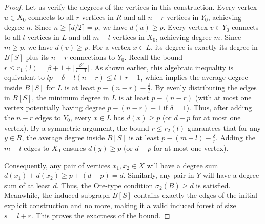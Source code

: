 \documentclass[10pt,a4paper]{amsart}
\begin{document}
\begin{proof}
Let us verify the degrees of the vertices in this construction. 
Every vertex $u \in X_0$ connects to all $r$ vertices in $R$ and all $n-r$ vertices in $Y_0$, achieving degree $n$. Since $n \ge \lceil d/2 \rceil = p$, we have $d(u) \ge p$.
Every vertex $v \in Y_0$ connects to all $l$ vertices in $L$ and all $m-l$ vertices in $X_0$, achieving degree $m$. Since $m \ge p$, we have $d(v) \ge p$.
For a vertex $x \in L$, its degree is exactly its degree in $B[S]$ plus its $n-r$ connections to $Y_0$. 
Recall the bound $r \le r_1(l) = \beta + 1 + \lfloor \frac{\beta'}{l-1} \rfloor$. As shown earlier, this algebraic inequality is equivalent to $lp - \delta - l(n-r) \le l+r-1$, which implies the average degree inside $B[S]$ for $L$ is at least $p - (n-r) - \frac{\delta}{l}$. By evenly distributing the edges in $B[S]$, the minimum degree in $L$ is at least $p - (n-r)$ (with at most one vertex potentially having degree $p - (n-r) - 1$ if $\delta=1$). Thus, after adding the $n-r$ edges to $Y_0$, every $x \in L$ has $d(x) \ge p$ (or $d-p$ for at most one vertex). 
By a symmetric argument, the bound $r \le r_2(l)$ guarantees that for any $y \in R$, the average degree inside $B[S]$ is at least $p - (m-l) - \frac{\delta}{r}$. Adding the $m-l$ edges to $X_0$ ensures $d(y) \ge p$ (or $d-p$ for at most one vertex).

Consequently, any pair of vertices $x_1, x_2 \in X$ will have a degree sum $d(x_1) + d(x_2) \ge p + (d-p) = d$. Similarly, any pair in $Y$ will have a degree sum of at least $d$. 
Thus, the Ore-type condition $\sigma_2(B) \ge d$ is satisfied. 
Meanwhile, the induced subgraph $B[S]$ contains exactly the edges of the initial explicit construction and no more, making it a valid induced forest of size $s = l+r$.
This proves the exactness of the bound.
\end{proof}
\end{document}
